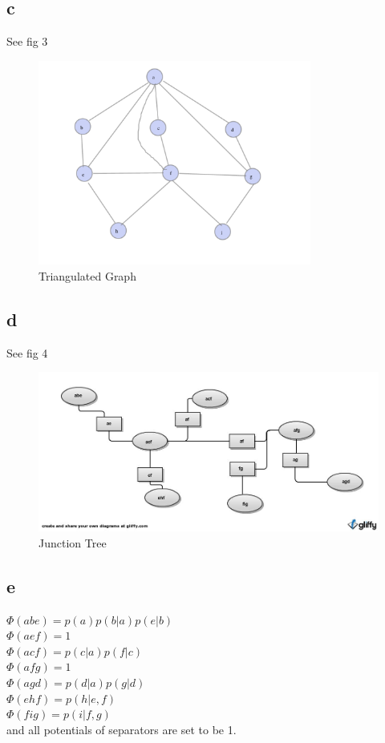 \documentclass[12pt]{amsart}
\begin{document}
\subsection*{c}
See fig 3
\begin{figure}[H]
  \centering
  \includegraphics[width=0.8\textwidth]{BN_Trg.pdf}
  \caption{Triangulated Graph}
\end{figure}
\subsection*{d}
See fig 4
\begin{figure}[H]
  \centering
  \includegraphics[width=1.1\textwidth]{Juncion_tree.jpg}
  \caption{Junction Tree}
\end{figure}
\subsection*{e}
$\Phi(abe)=p(a)p(b|a)p(e|b)$\\
\indent$\Phi(aef)=1$\\
\indent$\Phi(acf)=p(c|a)p(f|c)$\\
\indent$\Phi(afg)=1$\\
\indent$\Phi(agd)=p(d|a)p(g|d)$\\
\indent$\Phi(ehf)=p(h|e,f)$\\
\indent$\Phi(fig)=p(i|f,g)$\\
and all potentials of separators are set to be 1.
\end{document}
